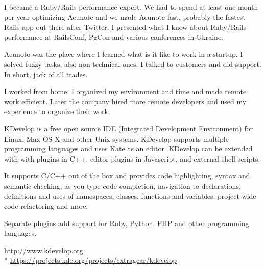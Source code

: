 \documentclass[12pt]{letter}
\begin{document}
\begin{llist}
           \item I became a Ruby/Rails performance expert. We had to spend at least one month per year optimizing Acunote and we made Acunote fast, probably the fastest Rails app out there after Twitter. I presented what I know about Ruby/Rails performance at RailsConf, PgCon and various conferences in Ukraine.

           \item Acunote was the place where I learned what is it like to work in a startup. I solved fuzzy tasks, also non-technical ones. I talked to customers and did support. In short, jack of all trades.

           \item I worked from home. I organized my environment and time and made remote work efficient. Later the company hired more remote developers and used my experience to organize their work.

  \endexperience




  \location{}

  \startexperience

           \item KDevelop is a free open source IDE (Integrated Development Environment) for Linux, Max OS X and other Unix systems. KDevelop supports multiple programming languages and uses Kate as an editor. KDevelop can be extended with with plugins in C++, editor plugins in Javascript, and external shell scripts.

           \item It supports C/C++ out of the box and provides code highlighting, syntax and semantic checking,  as-you-type code completion, navigation to declarations, definitions and uses of namespaces, classes, functions and variables, project-wide code refactoring and more.

            \item Separate plugins add support for Ruby, Python, PHP and other programming languages.

            \item \url{http://www.kdevelop.org}\\*
                  \url{https://projects.kde.org/projects/extragear/kdevelop}


\end{llist}
\end{document}
